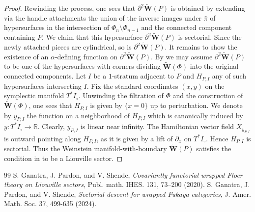 \documentclass[10pt,a4paper]{amsart}
\newcommand{\bR}{\mathbb{R}}
\newcommand{\bfW}{\mathbf{W}}
\newcommand{\del}{\partial}
\begin{document}
\begin{proof}
Rewinding the process,
one sees that
$\del^2 \widetilde{\bfW}(P)$
is obtained by extending via the handle attachments the union of the inverse images under
$\bar{\pi}$
of hypersurfaces in the intersection of
$\Phi_n \setminus \Phi_{n-1}$
and
the connected component containing
$P$.
We claim that
this hypersurface
$\del^2 \widetilde{\bfW}(P)$
is sectorial.
Since the newly attached pieces are cylindrical,
so is
$\del^2 \widetilde{\bfW}(P)$.
It remains to show the existence of an $\alpha$-defining function on
$\del^2 \widetilde{\bfW}(P)$.  
By
\cite[Construction 12.17]{GPS2}
we may assume
$\del^2 \widetilde{\bfW}(P)$
to be one of the hypersurfaces-with-corners dividing
$\widetilde{\bfW}(\Phi)$
into the original connected components.
Let
$I$
be a $1$-stratum adjacent to
$P$
and
$H_{P, I}$
any of such hypersurfaces intersecting
$I$.
Fix the standard coordinates
$(x, y)$
on the symplectic manifold
$T^* I_\circ$.
Unwinding
the filtration of
$\Phi$
and
the construction of
$\widetilde{\bfW}(\Phi)$,
one sees that
$H_{P, I}$
is given by
$\{ x = 0 \}$
up to perturbation.
We denote by
$y_{P, I}$
the function on a neighborhood of
$H_{P, I}$
which is canonically induced by
$y \colon T^* I_\circ \to \bR$.
Clearly,
$y_{P, I}$
is linear near infinity.
The Hamiltonian vector field
$X_{y_{P, I}}$
is outward pointing along
$H_{P, I}$,
as it is given by a lift of
$\del_x$
on 
$T^* I_\circ$.
Hence
$H_{P, I}$
is sectorial.
Thus the Weinstein manifold-with-boundary
$\widetilde{\bfW}(P)$
satisfies the condition in
\cite[Definition 2.4]{GPS1}
to be a Liouville sector.
\end{proof}

\begin{thebibliography}{99}
 S. Ganatra, J. Pardon, and V. Shende, \emph{Covariantly functorial wrapped Floer theory on Liouville sectors}, Publ. math. IHES. 131, 73–200 (2020).
 S. Ganatra, J. Pardon, and V. Shende, \emph{Sectorial descent for wrapped Fukaya categories}, J. Amer. Math. Soc. 37, 499-635 (2024).
\end{thebibliography}
\end{document}
